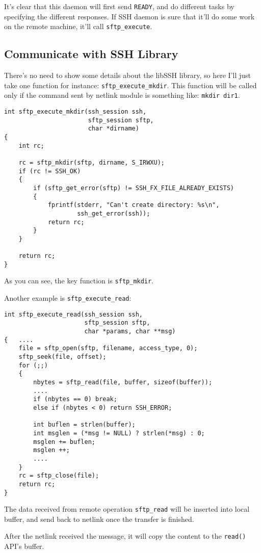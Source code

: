 It's clear that this daemon will first send \lstinline{READY}, and do different tasks by specifying the different responses.
If SSH daemon is sure that it'll do some work on the remote machine, it'll call \lstinline{sftp_execute}.

\subsection{Communicate with SSH Library}

There's no need to show some details about the libSSH library, so here I'll just take one function for instance: \lstinline{sftp_execute_mkdir}. This function will be called only if the command sent by netlink module is something like: \lstinline{mkdir dir1}. 

\begin{lstlisting}[title=\bfseries Remote Mkdir]
int sftp_execute_mkdir(ssh_session ssh, 
                       sftp_session sftp, 
                       char *dirname)
{
    int rc;

    rc = sftp_mkdir(sftp, dirname, S_IRWXU);
    if (rc != SSH_OK)
    {
        if (sftp_get_error(sftp) != SSH_FX_FILE_ALREADY_EXISTS)
        {
            fprintf(stderr, "Can't create directory: %s\n",
                    ssh_get_error(ssh));
            return rc;
        }
    }

    return rc;
}
\end{lstlisting}

As you can see, the key function is \lstinline{sftp_mkdir}. 

Another example is \lstinline{sftp_execute_read}:

\begin{lstlisting}[title=\bfseries Remote Read]
int sftp_execute_read(ssh_session ssh, 
                      sftp_session sftp, 
                      char *params, char **msg)
{   ....
    file = sftp_open(sftp, filename, access_type, 0);
    sftp_seek(file, offset);
    for (;;)
    {
        nbytes = sftp_read(file, buffer, sizeof(buffer));
        ....
        if (nbytes == 0) break;
        else if (nbytes < 0) return SSH_ERROR;

        int buflen = strlen(buffer);
        int msglen = (*msg != NULL) ? strlen(*msg) : 0;
        msglen += buflen;
        msglen ++;
        ....
    }
    rc = sftp_close(file);
    return rc;
}
\end{lstlisting}

The data received from remote operation \lstinline{sftp_read} will be inserted into local buffer, and send back to netlink once the transfer is finished. 

After the netlink received the message, it will copy the content to the \lstinline{read()} API's buffer.



